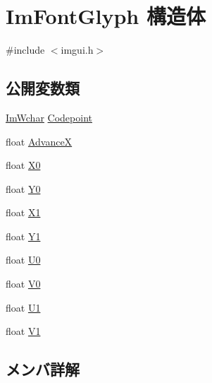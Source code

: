 \hypertarget{struct_im_font_glyph}{}\section{Im\+Font\+Glyph 構造体}
\label{struct_im_font_glyph}


{\ttfamily \#include $<$imgui.\+h$>$}

\subsection*{公開変数類}
\begin{DoxyCompactItemize}
\item 
\mbox{\hyperlink{imgui_8h_af2c7badaf05a0008e15ef76d40875e97}{Im\+Wchar}} \mbox{\hyperlink{struct_im_font_glyph_a3ff56d019068137a3df514caa3961421}{Codepoint}}
\item 
float \mbox{\hyperlink{struct_im_font_glyph_a11bfab7bcdb497fe2d649745c7d39b33}{AdvanceX}}
\item 
float \mbox{\hyperlink{struct_im_font_glyph_a1e93bf7292c052549972fc46646ff104}{X0}}
\item 
float \mbox{\hyperlink{struct_im_font_glyph_ac1deecd5b352949f30d396a58b68dd09}{Y0}}
\item 
float \mbox{\hyperlink{struct_im_font_glyph_a1d907170d807c5e5f2a43d74b99f0d89}{X1}}
\item 
float \mbox{\hyperlink{struct_im_font_glyph_aa6a0440694ae06c4cf03316498327bd2}{Y1}}
\item 
float \mbox{\hyperlink{struct_im_font_glyph_a3c9d90fb39f6beaf9d69413fa4c8366f}{U0}}
\item 
float \mbox{\hyperlink{struct_im_font_glyph_a26b7b7b9ee43ab67e98af9ea1131ce20}{V0}}
\item 
float \mbox{\hyperlink{struct_im_font_glyph_aaca9625f2d6972016e05fed583db85b0}{U1}}
\item 
float \mbox{\hyperlink{struct_im_font_glyph_a3d28904aad639835cdff3e4416663d7c}{V1}}
\end{DoxyCompactItemize}


\subsection{メンバ詳解}
\mbox{\label{struct_im_font_glyph_a11bfab7bcdb497fe2d649745c7d39b33}} 

